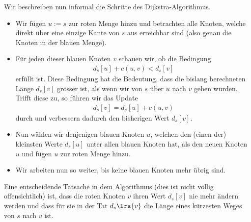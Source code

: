 \noindent
Wir beschreiben nun informal die Schritte des Dijkstra-Algorithmus.
\begin{itemize}
	\item Wir fügen $u:=s$ zur roten Menge hinzu und betrachten alle Knoten, welche direkt über eine einzige Kante von $s$ aus erreichbar sind (also genau die Knoten in der blauen Menge).
	\item Für jeden dieser blauen Knoten $v$ schauen wir, ob die Bedingung
	      \begin{align*}
		      d_s[u] + c(u,v) < d_s[v]
	      \end{align*}
	      erfüllt ist. Diese Bedingung hat die Bedeutung, dass die bislang berechneten Länge $d_s[v]$ grösser ist, als wenn wir von $s$ über $u$ nach $v$ gehen würden. Trifft diese zu, so führen wir das Update
	      \begin{align*}
		      d_s[v] = d_s[u] + c(u,v)
	      \end{align*}
	      durch und verbessern dadurch den bisherigen Wert $d_s[v]$.
	\item Nun wählen wir denjenigen blauen Knoten $u$, welchen den (einen der) kleinsten Werte $d_s[u]$ unter allen blauen Knoten hat, als den neuen Knoten $u$ und fügen $u$ zur roten Menge hinzu.
	\item Wir arbeiten nun so weiter, bis keine blauen Knoten mehr übrig sind.
\end{itemize}
Eine entscheidende Tatsache in dem Algorithmus (dies ist nicht völlig offensichtlich) ist, dass die roten Knoten $v$ ihren Wert $d_s[v]$ nie mehr ändern werden und dass für sie in der Tat  $d_s\lrs{v}$ die Länge eines kürzesten Weges von $s$ nach $v$ ist.


